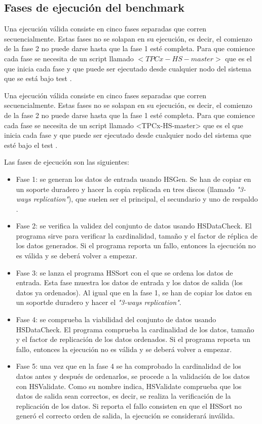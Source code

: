 \documentclass[10pt]{article}
\begin{document}
	\subsection{Fases de ejecución del benchmark}
		Una ejecución válida consiste en cinco fases separadas que corren secuencialmente. Estas fases no se solapan en su ejecución, es decir, el comienzo de la fase 2 no puede darse hasta que la fase 1 esté completa. Para que comience cada fase se necesita de un script llamado $<TPCx-HS-master>$ que es el que inicia cada fase y que puede ser ejecutado desde cualquier nodo del sistema que se está bajo test \cite{tpcxhs}.
		
		Una ejecución válida consiste en cinco fases separadas que corren secuencialmente. Estas fases no se solapan en su ejecución, es decir, el comienzo de la fase 2 no puede darse hasta que la fase 1 esté completa. Para que comience cada fase se necesita de un script llamado <TPCx-HS-master> que es el que inicia cada fase y que puede ser ejecutado desde cualquier nodo del sistema que esté bajo el test \cite{tpcxhs}.

		
		Las fases de ejecución son las siguientes:
		
		\begin{itemize}
			\item Fase 1: se generan los datos de entrada usando HSGen. Se han de copiar en un soporte duradero y hacer la copia replicada en tres discos (llamado \textit{"3-ways replication"}), que suelen ser el principal, el secundario y uno de respaldo \cite{replication}.
			\item Fase 2: se verifica la validez del conjunto de datos usando HSDataCheck. El programa sirve para verificar la cardinalidad, tamaño y el factor de réplica de los datos generados. Si el programa reporta un fallo, entonces la ejecución no es válida y se deberá volver a empezar.
			\item Fase 3: se lanza el programa HSSort con el que se ordena los datos de entrada. Esta fase muestra los datos de entrada y los datos de salida (los datos ya ordenados). Al igual que en la fase 1, se han de copiar los datos en un soportde duradero y hacer el \textit{"3-ways replication"}.
			\item Fase 4: se comprueba la viabilidad del conjunto de datos usando HSDataCheck. El programa comprueba la cardinalidad de los datos, tamaño y el factor de replicación de los datos ordenados. Si el programa reporta un fallo, entonces la ejecución no es válida y se deberá volver a empezar.
			\item Fase 5: una vez que en la fase 4 se ha comprobado la cardinalidad de los datos antes y después de ordenarlos, se procede a la validación de los datos con HSValidate. Como su nombre indica, HSValidate comprueba que los datos de salida sean correctos, es decir, se realiza la verificación de la replicación de los datos. Si reporta el fallo consisten en que el HSSort no generó el correcto orden de salida, la ejecución se considerará inválida.
		\end{itemize}
		
\end{document}

